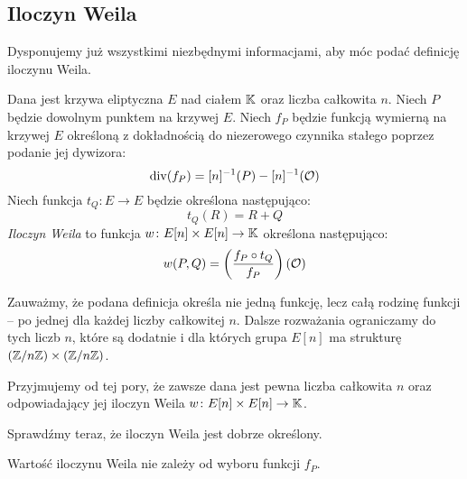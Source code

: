 \subsection*{Iloczyn Weila}

\noindent
Dysponujemy już wszystkimi niezbędnymi informacjami,
aby móc podać definicję iloczynu Weila.

\begin{definition}\label{weil_pairing_def}
Dana jest krzywa eliptyczna $E$ nad ciałem $\mathbb{K}$
oraz liczba całkowita $n$.
Niech $P$ będzie dowolnym punktem na krzywej $E$.
Niech $f_P$ będzie funkcją wymierną na krzywej $E$
określoną z dokładnością do niezerowego czynnika stałego
poprzez podanie jej dywizora:
\begin{equation}
\operatorname{div}(f_P) = [n]^{-1}(P) - [n]^{-1}(\mathcal{O})
\end{equation}
Niech funkcja $t_Q\colon E \to E$ będzie określona następująco:
\begin{equation}
t_Q(R) = R + Q
\end{equation}
\emph{Iloczyn Weila} to funkcja
$w\colon E[n] \times E[n] \to \mathbb{K}$
określona następująco:
\begin{equation}\label{weil_pairing_eqn}
w(P, Q) = \left(\frac{f_P \circ t_Q}{f_P}\right)(\mathcal{O})
\end{equation}
\end{definition}

\begin{remark}
Zauważmy, że podana definicja określa nie jedną funkcję,
lecz całą rodzinę funkcji --
po jednej dla każdej liczby całkowitej $n$.
Dalsze rozważania ograniczamy do tych liczb $n$,
które są dodatnie i dla których
grupa $E[n]$ ma strukturę $(\mathbb{Z} / n\mathbb{Z})\times(\mathbb{Z} / n\mathbb{Z})$.
\end{remark}

\begin{remark}
Przyjmujemy od tej pory, że zawsze dana jest pewna liczba całkowita $n$
oraz odpowiadający jej iloczyn Weila $w\colon E[n] \times E[n] \to \mathbb{K}$.
\end{remark}

\noindent
Sprawdźmy teraz, że iloczyn Weila jest dobrze określony.

\begin{lemma}\label{weil_pairing_ignore_const_lemma}
Wartość iloczynu Weila nie zależy od wyboru funkcji $f_P$.
\end{lemma}

